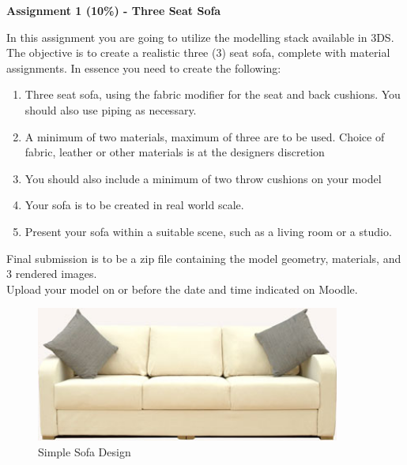 
	
\begin{flushleft}
\Large\textbf{Assignment 1 (10\%) - Three Seat Sofa }\\
\end{flushleft}

In this assignment you are going to utilize the modelling stack available in 3DS.  The objective is to create a realistic three (3) seat sofa, complete with material assignments.  In essence you need to create the following:
\begin{enumerate}
	\item Three seat sofa, using the fabric modifier for the seat and back cushions.  You should also use piping as necessary.
	\item A minimum of two materials, maximum of three are to be used.  Choice of fabric, leather or other materials is at the designers discretion
	\item You should also include a minimum of two throw cushions on your model
	\item Your sofa is to be created in real world scale.
	\item Present your sofa within a suitable scene, such as a living room or a studio.
\end{enumerate}

Final submission is to be a zip file containing the model geometry, materials, and 3 rendered images.\\

Upload your model on or before the date and time indicated on Moodle.
\vspace{1cm}

\begin{figure}[hb]
	\centering
		\includegraphics[width=10cm]{img/Holl_3_Seat_Sofa-1435.jpg}
		\caption{Simple Sofa Design}
	\label{fig:Holl_3_Seat_Sofa-1435}
\end{figure}









